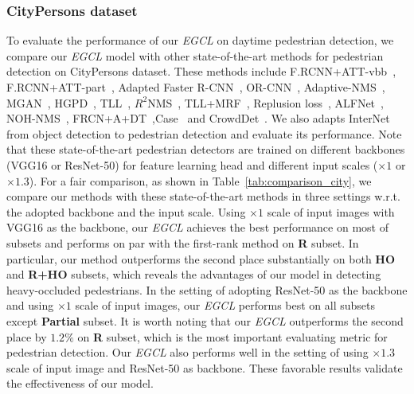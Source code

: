 \documentclass[journal]{IEEEtran}
\newcommand{\MR}[1]{\textcolor[rgb]{0,0,0} {#1}}
\begin{document}
\subsubsection{CityPersons dataset}
To evaluate the performance of our \emph{EGCL} on daytime pedestrian detection, we compare our \emph{EGCL} model with other state-of-the-art methods for pedestrian detection on CityPersons dataset. These methods include F.RCNN+ATT-vbb~\cite{zhang2018occluded}, F.RCNN+ATT-part~\cite{zhang2018occluded}, Adapted Faster R-CNN~\cite{zhang2017citypersons}, OR-CNN~\cite{zhang2018occlusion}, Adaptive-NMS~\cite{liu2019adaptive}, MGAN~\cite{pang2019mask}, HGPD~\cite{li2020learning}, TLL~\cite{song2018small}, $R^{2}$NMS~\cite{huang2020nms}, TLL+MRF~\cite{song2018small}, Replusion loss~\cite{wang2018repulsion}, ALFNet~\cite{liu2018learning}, NOH-NMS~\cite{zhou2020noh}, \MR{FRCN+A+DT~\cite{zhou2019discriminative}},Case~\cite{xie2020count} and CrowdDet~\cite{chu2020detection}. We also adapts InterNet~\cite{li2019feature} from object detection to pedestrian detection and evaluate its performance.
Note that these state-of-the-art pedestrian detectors are trained on different backbones (VGG16 or ResNet-50) for feature learning head and different input scales ($\times 1$ or $\times 1.3$). For a fair comparison, as shown in Table~\ref{tab:comparison_city}, we compare our methods with these state-of-the-art methods in three settings w.r.t. the adopted backbone and the input scale. Using $\times 1$ scale of input images with VGG16 as the backbone, our \emph{EGCL} achieves the best performance on most of subsets and performs on par with the first-rank method on \textbf{R} subset. In particular, our method outperforms the second place substantially on both \textbf{HO} and \textbf{R+HO} subsets, which reveals the advantages of our model in detecting heavy-occluded pedestrians. In the setting of adopting ResNet-50 as the backbone and using $\times 1$ scale of input images, our \emph{EGCL} performs best on all subsets except \textbf{Partial} subset. It is worth noting that our \emph{EGCL} outperforms the second place by $1.2\%$ on  \textbf{R} subset, which is the most important evaluating metric for pedestrian detection. Our \emph{EGCL} also performs well in the setting of using $\times 1.3$ scale of input image and ResNet-50 as backbone. These favorable results validate the effectiveness of our model.
\end{document}
